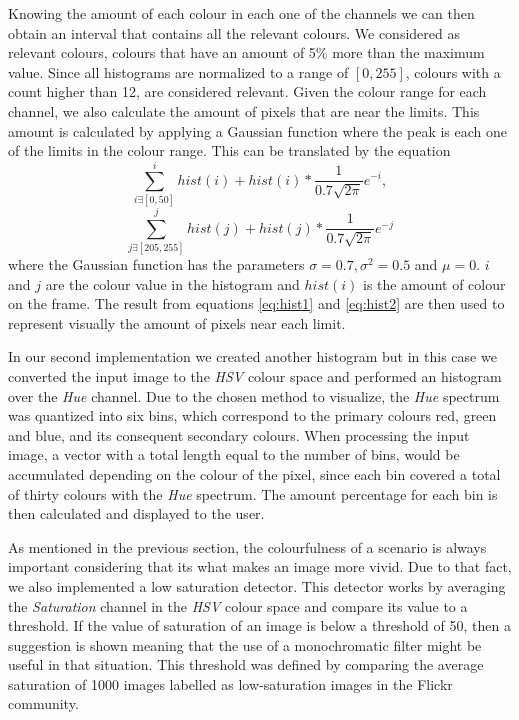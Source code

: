 Knowing the amount of each colour in each one of the channels we can then obtain an interval that contains all the relevant colours. We considered as relevant colours, colours that have an amount of 5\% more than the maximum value. Since all histograms are normalized to a range of $[0,255]$, colours with a count higher than 12, are considered relevant. Given the colour range for each channel, we also calculate the amount of pixels that are near the limits. This amount is calculated by applying a Gaussian function where the peak is each one of the limits in the colour range. This can be translated by the equation
\begin{equation}
	\sum_{i \exists [0,50]}^{i}hist(i) + hist(i)*\frac{1}{0.7\sqrt{2\pi}}e^{-i},
	\label{eq:hist1}
\end{equation}
\begin{equation}
	\sum_{j \exists [205,255]}^{j}hist(j) + hist(j)*\frac{1}{0.7\sqrt{2\pi}}e^{-j}
	\label{eq:hist2}
\end{equation}
where the Gaussian function has the parameters $\sigma = 0.7, \sigma^{2} = 0.5$ and $\mu = 0$. $i$ and $j$ are the colour value in the histogram and $hist(i)$ is the amount of colour on the frame. The result from equations \ref{eq:hist1} and \ref{eq:hist2} are then used to represent visually the amount of pixels near each limit. 

In our second implementation we created another histogram but in this case we converted the input image to the \emph{HSV} colour space and performed an histogram over the \emph{Hue} channel. Due to the chosen method to visualize, the \emph{Hue} spectrum was quantized into six bins, which correspond to the primary colours red, green and blue, and its consequent secondary colours.
When processing the input image, a vector with a total length equal to the number of bins, would be accumulated depending on the colour of the pixel, since each bin covered a total of thirty colours with the \emph{Hue} spectrum. The amount percentage for each bin is then calculated and displayed to the user.

As mentioned in the previous section, the colourfulness of a scenario is always important considering that its what makes an image more vivid. Due to that fact, we also implemented a low saturation detector. This detector works by averaging the \emph{Saturation} channel in the \emph{HSV} colour space and compare its value to a threshold. If the value of saturation of an image is below a threshold of 50, then a suggestion is shown meaning that the use of a monochromatic filter might be useful in that situation. This threshold was defined by comparing the average saturation of 1000 images labelled as low-saturation images in the Flickr community.

